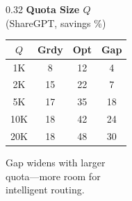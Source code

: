 \documentclass[aspectratio=169,10pt]{beamer}
\begin{document}
\begin{frame}[noframenumbering]
\begin{columns}[T]
\begin{column}{0.32\textwidth}
\footnotesize
\textbf{Quota Size $Q$}\\
\scriptsize (ShareGPT, savings \%)

\vspace{0.1cm}
\begin{tabular}{@{}cccc@{}}
\toprule
$Q$ & Grdy & Opt & Gap \\
\midrule
1K & 8 & 12 & 4 \\
2K & 15 & 22 & 7 \\
5K & 17 & 35 & 18 \\
10K & 18 & 42 & 24 \\
20K & 18 & 48 & 30 \\
\bottomrule
\end{tabular}

\vspace{0.1cm}
\scriptsize Gap widens with larger\\quota---more room for\\intelligent routing.
\end{column}
\end{columns}

\vspace{0.2cm}
\begin{center}
\end{center}
\end{frame}
\end{document}
